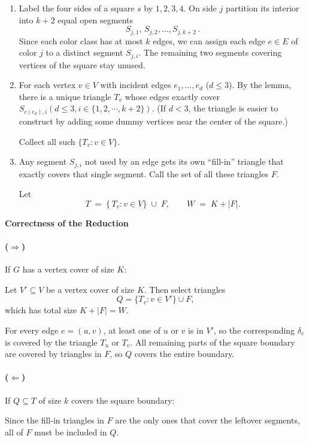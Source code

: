 \documentclass[11pt]{article}
\begin{document}
\begin{description}
\begin{enumerate}
  \item[2.]
  Label the four sides of a square \(s\) by \(1,2,3,4\).  On side \(j\) partition its interior into \(k+2\) equal open segments
  \[
    S_{j,1},\,S_{j,2},\dots,S_{j,k+2}\,.
  \]
  Since each color class has at most \(k\) edges, we can assign each edge \(e\in E\) of color \(j\) to a distinct segment \(S_{j,i}\).  The remaining two segments covering vertices of the square stay unused.

  \item[3.]
  For each vertex \(v\in V\) with incident edges \(e_1,\dots,e_d\) (\(d\le3\)). By the lemma, there is a unique triangle \(T_v\) whose edges exactly cover \({S_{c(e_d),i}} (d\le3, i\in \{1, 2, \cdots, k+2\})\). (If \(d<3\), the triangle is easier to construct by adding some dummy vertices near the center of the square.)
  
  Collect all such \(\{T_v : v\in V\}\).

  \item[4.]
  Any segment \(S_{j,i}\) not used by an edge gets its own ``fill-in'' triangle that exactly covers that single segment.  Call the set of all these triangles \(F\).
  
  Let
  \[
    T \;=\;\{\,T_v : v\in V\}\;\cup\;F,
    \qquad
    W \;=\; K + |F|.
  \]
\end{enumerate}

\textbf{Correctness of the Reduction}

\paragraph{($\Rightarrow$)} 
If $G$ has a vertex cover of size $K$:

Let $V' \subseteq V$ be a vertex cover of size $K$. Then select triangles
\[
Q = \{T_v : v \in V'\} \cup F,
\]
which has total size $K + |F| = W$.

For every edge $e = (u,v)$, at least one of $u$ or $v$ is in $V'$, so the corresponding $\delta_e$ is covered by the triangle $T_u$ or $T_v$. All remaining parts of the square boundary are covered by triangles in $F$, so $Q$ covers the entire boundary.

\paragraph{($\Leftarrow$)}
If $Q \subseteq T$ of size $k$ covers the square boundary:

Since the fill-in triangles in $F$ are the only ones that cover the leftover segments, all of $F$ must be included in $Q$.


\end{description}
\end{document}
